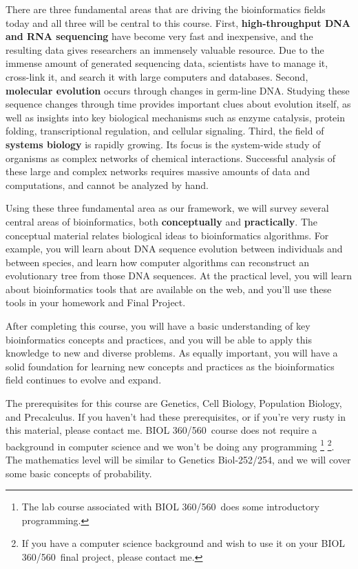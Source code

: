 \documentclass[12pt]{article}
\newcommand{\course}{BIOL 360/560}
\begin{document}
There are three fundamental areas that are driving the bioinformatics fields
today and all three will
be central to
this course.  First, \textbf{high-throughput DNA and RNA sequencing} have become very fast and
inexpensive, and the resulting data gives researchers an immensely valuable resource.
Due to the immense amount of generated sequencing data, scientists have to manage it, cross-link it, and
search it with large computers and databases.  Second, \textbf{molecular
  evolution} occurs through changes in germ-line DNA. Studying
these sequence changes through time provides important clues about evolution itself, as well
as insights into key biological mechanisms such as enzyme catalysis, protein
folding, transcriptional regulation, and cellular signaling.  Third, the field
of \textbf{systems biology} is rapidly growing. Its focus is the system-wide
study of organisms as complex networks of chemical interactions. Successful
analysis of these large and complex networks requires massive
amounts of data and computations, and cannot be analyzed by hand.


Using these three fundamental area as our framework, we will survey several
central areas of bioinformatics, both \textbf{conceptually} and
\textbf{practically}.  The conceptual material relates biological ideas to
bioinformatics algorithms. For example, you will learn about DNA sequence
evolution between individuals and between species, and learn how computer
algorithms can reconstruct an evolutionary tree from those DNA sequences.  At
the practical level, you will learn about bioinformatics tools that are available on the
web, and you'll use these tools in your homework and Final Project.


After completing this course, you will have a basic understanding of key
bioinformatics concepts and practices, and you will be able to apply this
knowledge to new and diverse problems.  As equally important, you will have a
solid foundation for learning new concepts and practices as the bioinformatics field
continues to evolve and expand.


The prerequisites for this course are Genetics, Cell Biology, Population
Biology, and Precalculus.  If you haven't had these prerequisites, or if you're
very rusty in this material, please contact me.  \course\ course does not
require a background in computer science and we won't be doing any programming
\footnote{The lab course associated with \course\ does some introductory
  programming.} \footnote{If you have a computer science background and wish to
  use it on your \course\ final project, please contact me.}.  The mathematics
level will be similar to Genetics Biol-252/254, and we will cover some basic
concepts of probability.
\end{document}
